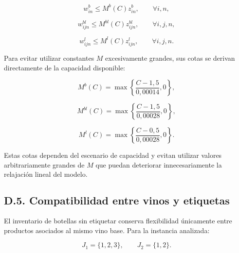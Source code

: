 \begin{equation}
    w^{b}_{in}
    \leq
    M^{b}(C)z^{b}_{in},
    \qquad \forall i,n,
    \label{eq:anexoD-setup-embotellado}
\end{equation}

\begin{equation}
    w^{bl}_{ijn}
    \leq
    M^{bl}(C)z^{bl}_{ijn},
    \qquad \forall i,j,n,
    \label{eq:anexoD-setup-acoplado}
\end{equation}

\begin{equation}
    w^{l}_{ijn}
    \leq
    M^{l}(C)z^{l}_{ijn},
    \qquad \forall i,j,n.
    \label{eq:anexoD-setup-etiquetado}
\end{equation}

Para evitar utilizar constantes $M$ excesivamente grandes, sus cotas se
derivan directamente de la capacidad disponible:

\begin{equation}
    M^{b}(C)
    =
    \max
    \left\{
        \frac{C-1{,}5}{0{,}00014},
        0
    \right\},
    \label{eq:anexoD-bigM-embotellado}
\end{equation}

\begin{equation}
    M^{bl}(C)
    =
    \max
    \left\{
        \frac{C-1{,}5}{0{,}00028},
        0
    \right\},
    \label{eq:anexoD-bigM-acoplado}
\end{equation}

\begin{equation}
    M^{l}(C)
    =
    \max
    \left\{
        \frac{C-0{,}5}{0{,}00028},
        0
    \right\}.
    \label{eq:anexoD-bigM-etiquetado}
\end{equation}

Estas cotas dependen del escenario de capacidad y evitan utilizar valores
arbitrariamente grandes de $M$ que puedan deteriorar innecesariamente la
relajación lineal del modelo.


\subsection*{D.5. Compatibilidad entre vinos y etiquetas}

El inventario de botellas sin etiquetar conserva flexibilidad únicamente entre
productos asociados al mismo vino base. Para la instancia analizada:

\begin{equation}
    J_1 = \{1,2,3\},
    \qquad
    J_2 = \{1,2\}.
    \label{eq:anexoD-compatibilidad}
\end{equation}

